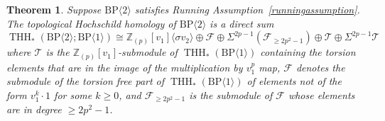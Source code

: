 \documentclass[11pt]{amsart}
\newcommand{\mr}[1]{\mathrm{#1}}
\newcommand{\Z}{\mathbb{Z}}
\newcommand{\BP}{\mr{BP}}
\DeclareMathOperator{\THH}{THH}
\newtheorem{theorem}[equation]{Theorem}
\theoremstyle{definition}
\numberwithin{equation}{section}
\numberwithin{figure}{section}
\begin{document}
\begin{theorem}\label{thm:main-v2}
Suppose $\BP\langle 2\rangle$ satisfies Running Assumption~\ref{runningassumption}. 
The topological Hochschild homology of $\BP\langle 2\rangle$ is a direct sum
  \[
    \THH_*(\BP \langle 2 \rangle ; \BP \langle 1 \rangle) \cong \Z_{(p)}[v_1] \langle \sigma v_2 \rangle \oplus \mathcal{F} \oplus \Sigma^{2p - 1} (\mathcal{F}_{\geq 2p^2 - 1}) \oplus \mathcal{T} \oplus \Sigma^{2p - 1} \mathcal{T}
  \]
  where $\mathcal{T}$ is the $\Z_{(p)}[v_1]$-submodule of $\THH_*(\BP \langle 1 \rangle)$ containing the torsion elements that are in the image of the multiplication by $v_1^p$ map,  $\mathcal{F}$ denotes the submodule of the torsion free part of $\THH_*(\BP \langle 1 \rangle)$ of elements not of the form $v_1^k \cdot 1$ for some $k \geq 0$, and $\mathcal{F}_{\geq 2p^2 -1}$ is the submodule of $\mathcal{F}$ whose elements are in degree $\geq 2p^2 -1$.
\end{theorem}
\end{document}
